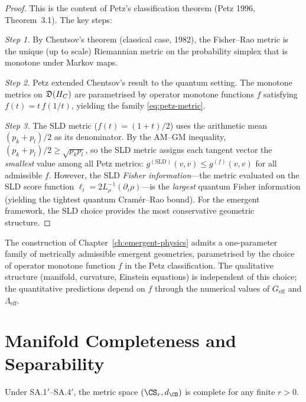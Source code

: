 \begin{proof}
This is the content of Petz's classification theorem (Petz 1996,
Theorem~3.1).  The key steps:

\emph{Step 1.} By Chentsov's theorem (classical case, 1982), the Fisher--Rao
metric is the unique (up to scale) Riemannian metric on the probability
simplex that is monotone under Markov maps.

\emph{Step 2.} Petz extended Chentsov's result to the quantum setting.
The monotone metrics on $\mathfrak{D}(H_C)$ are parametrised by
operator monotone functions $f$ satisfying $f(t) = t\,f(1/t)$,
yielding the family \eqref{eq:petz-metric}.

\emph{Step 3.} The SLD metric ($f(t) = (1+t)/2$) uses the arithmetic mean
$(p_k + p_l)/2$ as its denominator.  By the AM--GM inequality,
$(p_k + p_l)/2 \geq \sqrt{p_k p_l}$, so the SLD metric assigns each
tangent vector the \emph{smallest} value among all Petz metrics:
$g^{(\mathrm{SLD})}(v,v) \leq g^{(f)}(v,v)$ for all admissible $f$.
However, the SLD \emph{Fisher information}---the metric evaluated on
the SLD score function $\ell_i = 2L_\rho^{-1}(\partial_i\rho)$---is
the \emph{largest} quantum Fisher information (yielding the tightest
quantum Cram\'er--Rao bound).  For the emergent framework, the SLD
choice provides the most conservative geometric structure.
\end{proof}

\begin{corollary}\label{cor:15.2}
The construction of Chapter~\ref{ch:emergent-physics} admits a
one-parameter family of metrically admissible emergent geometries,
parametrised by the choice of operator monotone function $f$ in the
Petz classification.  The qualitative structure (manifold, curvature,
Einstein equations) is independent of this choice; the quantitative
predictions depend on $f$ through the numerical values of
$G_{\mathrm{eff}}$ and $\Lambda_{\mathrm{eff}}$.
\end{corollary}

\section{Manifold Completeness and Separability}
\label{sec:ch15:manifold}

\begin{theorem}\label{thm:15.4}
Under SA.1$'$--SA.4$'$, the metric space $(\CS_r, d_{\CD})$ is complete
for any finite $r > 0$.
\end{theorem}

